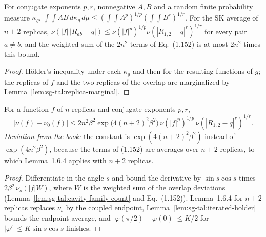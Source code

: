 \begin{lemma}
\label{lem:sg-tal:iterated-holder}
  \leanok
{}
For conjugate exponents $p,r$, nonnegative $A,B$ and a random finite probability measure $\kappa_g$,
$\int\!\int AB\,d\kappa_g\,d\mu\le(\int\!\int A^p)^{1/p}(\int\!\int B^r)^{1/r}$. For the SK average of
$n+2$ replicas, $\nu(|f|\,|R_{ab}-q|)\le\nu(|f|^p)^{1/p}\nu(|R_{1,2}-q|^r)^{1/r}$ for every pair $a\ne b$, and the
weighted sum of the $2n^2$ terms of Eq.~(1.152) is at most $2n^2$ times this bound.
\end{lemma}
\begin{proof}
  \leanok
H\"older's inequality under each $\kappa_g$ and then for the resulting functions of $g$; the replicas
of $f$ and the two replicas of the overlap are marginalized by Lemma~\ref{lem:sg-tal:replica-marginal}.
\end{proof}

\begin{theorem}
\label{thm:sg-tal:cavity-holder}
  \leanok
{}
For a function $f$ of $n$ replicas and conjugate exponents $p,r$,
\[
|\nu(f)-\nu_0(f)|\le2n^2\beta^2\exp\bigl(4(n+2)^2\beta^2\bigr)\,\nu(|f|^p)^{1/p}\,\nu(|R_{1,2}-q|^r)^{1/r}.
\]
\emph{Deviation from the book:} the constant is $\exp(4(n+2)^2\beta^2)$ instead of $\exp(4n^2\beta^2)$, because
the terms of (1.152) are averages over $n+2$ replicas, to which Lemma~1.6.4 applies with $n+2$ replicas.
\end{theorem}
\begin{proof}
  \leanok
Differentiate in the angle $s$ and bound the derivative by $\sin s\cos s$ times $2\beta^2\,\nu_s(|f|W)$, where
$W$ is the weighted sum of the overlap deviations (Lemma~\ref{lem:sg-tal:cavity-family-count} and
Eq.~(1.152)). Lemma~1.6.4 for $n+2$ replicas replaces $\nu_s$ by the coupled endpoint, Lemma~\ref{lem:sg-tal:iterated-holder}
bounds the endpoint average, and $|\varphi(\pi/2)-\varphi(0)|\le K/2$ for $|\varphi'|\le K\sin s\cos s$ finishes.
\end{proof}


